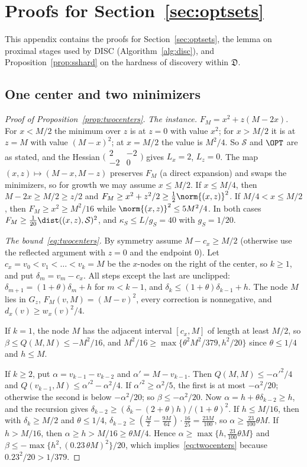 \section{Proofs for Section~\ref{sec:optsets}}\label{app:proximal}

This appendix contains the proofs for Section~\ref{sec:optsets}, the lemma on
proximal stages used by DISC (Algorithm~\ref{alg:disc}), and
Proposition~\ref{prop:sshard} on the hardness of discovery within
$\mathfrak D$.

\subsection{One center and two minimizers}

\begin{proof}[Proof of Proposition~\ref{prop:twocenters}]
\emph{The instance.} $F_M=x^2+z(M-2x)$. For $x<M/2$ the minimum over $z$ is
at $z=0$ with value $x^2$; for $x>M/2$ it is at $z=M$ with value $(M-x)^2$;
at $x=M/2$ the value is $M^2/4$. So $\mathcal S$ and $\OPT$ are as stated,
and the Hessian $\bigl(\begin{smallmatrix}2&-2\\-2&0\end{smallmatrix}\bigr)$
gives $L_x=2$, $L_z=0$. The map $(x,z)\mapsto(M-x,M-z)$ preserves $F_M$ (a
direct expansion) and swaps the minimizers, so for growth we may assume
$x\le M/2$. If $x\le M/4$, then $M-2x\ge M/2\ge z/2$ and
$F_M\ge x^2+z^2/2\ge\frac12\norm{(x,z)}^2$. If $M/4<x\le M/2$, then
$F_M\ge x^2\ge M^2/16$ while $\norm{(x,z)}^2\le5M^2/4$. In both cases
$F_M\ge\frac1{20}\dist((x,z),\mathcal S)^2$, and
$\kappa_S\le L/g_S=40$ with $g_S=1/20$.

\emph{The bound~\eqref{eq:twocenters}.} By symmetry assume $M-c_x\ge M/2$
(otherwise use the reflected argument with $z=0$ and the endpoint $0$). Let
$c_x=v_0<v_1<\dots<v_k=M$ be the $x$-nodes on the right of the center, so
$k\ge1$, and put $\delta_m=v_m-c_x$. All steps except the last are unclipped:
$\delta_{m+1}=(1+\theta)\delta_m+h$ for $m<k-1$, and
$\delta_k\le(1+\theta)\delta_{k-1}+h$. The node $M$ lies in $G_z$,
$F_M(v,M)=(M-v)^2$, every correction is nonnegative, and
$d_x(v)\ge w_x(v)^2/4$.

If $k=1$, the node $M$ has the adjacent interval $[c_x,M]$ of length at least
$M/2$, so $\beta\le Q(M,M)\le-M^2/16$, and
$M^2/16\ge\max\{\theta^2M^2/379,h^2/20\}$ since $\theta\le1/4$ and $h\le M$.

If $k\ge2$, put $\alpha=v_{k-1}-v_{k-2}$ and $\alpha'=M-v_{k-1}$. Then
$Q(M,M)\le-\alpha'^2/4$ and $Q(v_{k-1},M)\le\alpha'^2-\alpha^2/4$. If
$\alpha'^2\ge\alpha^2/5$, the first is at most $-\alpha^2/20$; otherwise the
second is below $-\alpha^2/20$; so $\beta\le-\alpha^2/20$. Now
$\alpha=h+\theta\delta_{k-2}\ge h$, and the recursion gives
$\delta_{k-2}\ge(\delta_k-(2+\theta)h)/(1+\theta)^2$. If $h\le M/16$, then
with $\delta_k\ge M/2$ and $\theta\le1/4$,
$\delta_{k-2}\ge(\frac M2-\frac{9M}{64})\cdot\frac{16}{25}=\frac{23M}{100}$, so
$\alpha\ge\frac{23}{100}\theta M$. If $h>M/16$, then
$\alpha\ge h>M/16\ge\theta M/4$. Hence $\alpha\ge\max\{h,\frac{23}{100}\theta M\}$
and $\beta\le-\max\{h^2,(0.23\,\theta M)^2\}/20$, which
implies~\eqref{eq:twocenters} because $0.23^2/20>1/379$.


\end{proof}
